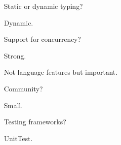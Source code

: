 \begin{frame}
  \begin{center}
    Static or dynamic typing?
    \vskip15pt
    
    Dynamic.
  \end{center}
\end{frame}

\begin{frame}
  \begin{center}
    Support for concurrency?
    \vskip15pt
    
    Strong.
  \end{center}
\end{frame}

\begin{frame}
  \begin{center}
    Not language features but important.
  \end{center}
\end{frame}

\begin{frame}
  \begin{center}
    Community?
    \vskip15pt
    
    Small.
  \end{center}
\end{frame}

\begin{frame}
  \begin{center}
    Testing frameworks?
    \vskip15pt
    
    UnitTest.
  \end{center}
\end{frame}
